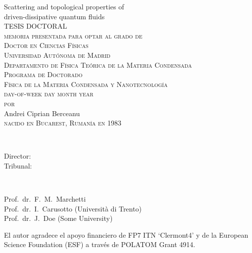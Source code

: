 \thispagestyle{empty}

\begin{center}
{\Huge  Scattering and topological properties of \\ driven-dissipative quantum fluids\\}
\vspace{5.4cm}
{\large{TESIS DOCTORAL}}\\
\vspace{2.6cm}
{ \textsc{memoria presentada para optar al grado de \\ Doctor en Ciencias F\'{i}sicas\\
Universidad Aut\'{o}noma de Madrid\\
Departamento de F\'{i}sica Te\'{o}rica de la Materia Condensada\\
Programa de Doctorado\\
F\'{i}sica de la Materia Condensada y Nanotecnolog\'{i}a\\
day-of-week day month year\\ %
$\,$\\$\,$\\por\\$\,$\\$\,$\\}
{\LARGE{Andrei Ciprian Berceanu}}\\$\,$ \\\textsc{nacido en Bucarest, Ruman\'{i}a en 1983}}
\end{center}
\newpage

\thispagestyle{empty}
\\[2ex]
  \parbox[t]{2.8cm}{Director:\\
                  Tribunal:
}~\parbox[t]{9cm}{Prof.\ dr.\ F.\ M.\ Marchetti \\
Prof.\ dr.\ I.\ Carusotto (Universit\`{a} di Trento) \\
Prof.\ dr.\ J.\ Doe (Some University)
}


\vfill


\noindent
\begin{otherlanguage}{spanish}
El autor agradece el apoyo financiero de FP7 ITN `Clermont4' y
de la European Science Foundation (ESF) a trav\'{e}s de POLATOM Grant 4914.
\end{otherlanguage}
\vspace{\baselineskip}

